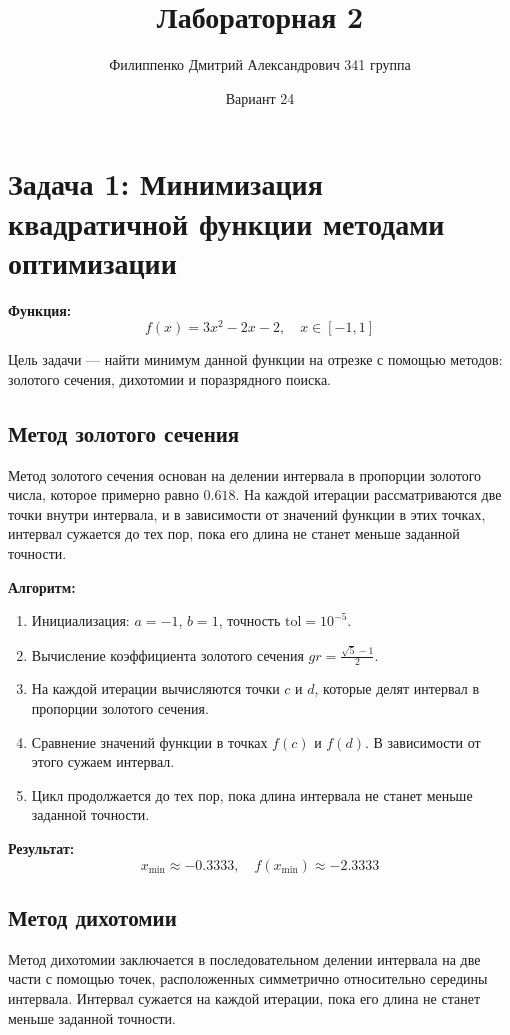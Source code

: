 \documentclass[a4paper,12pt]{article}
\title{Лабораторная 2}
\author{Филиппенко Дмитрий Александрович 341 группа}
\date{Вариант 24}
\begin{document}
\maketitle

\section{Задача 1: Минимизация квадратичной функции методами оптимизации}

\textbf{Функция:} 
\[
f(x) = 3x^2 - 2x - 2, \quad x \in [-1, 1]
\]

Цель задачи — найти минимум данной функции на отрезке с помощью методов: золотого сечения, дихотомии и поразрядного поиска.

\subsection{Метод золотого сечения}

Метод золотого сечения основан на делении интервала в пропорции золотого числа, которое примерно равно \(0.618\). На каждой итерации рассматриваются две точки внутри интервала, и в зависимости от значений функции в этих точках, интервал сужается до тех пор, пока его длина не станет меньше заданной точности.

\textbf{Алгоритм:}
\begin{enumerate}
    \item Инициализация: \( a = -1 \), \( b = 1 \), точность \( \text{tol} = 10^{-5} \).
    \item Вычисление коэффициента золотого сечения \( gr = \frac{\sqrt{5} - 1}{2} \).
    \item На каждой итерации вычисляются точки \( c \) и \( d \), которые делят интервал в пропорции золотого сечения.
    \item Сравнение значений функции в точках \( f(c) \) и \( f(d) \). В зависимости от этого сужаем интервал.
    \item Цикл продолжается до тех пор, пока длина интервала не станет меньше заданной точности.
\end{enumerate}

\textbf{Результат:}
\[
x_{\text{min}} \approx -0.3333, \quad f(x_{\text{min}}) \approx -2.3333
\]

\subsection{Метод дихотомии}

Метод дихотомии заключается в последовательном делении интервала на две части с помощью точек, расположенных симметрично относительно середины интервала. Интервал сужается на каждой итерации, пока его длина не станет меньше заданной точности.
\end{document}
